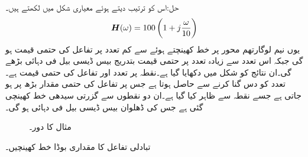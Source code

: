 حل:اس کو ترتیب دیتے ہوئے معیاری شکل میں لکھتے ہیں۔
\begin{align*}
{\ensuremath{{\boldsymbol{H}}}}(\omega)=100\left(1+j\frac{\omega}{10}\right)
\end{align*}
یوں نیم لوگارتھم محور پر خط کھینچتے ہوئے  سے کم تعدد  پر تفاعل کی حتمی قیمت  ہو گی جبکہ اس تعدد سے زیادہ تعدد پر حتمی قیمت بتدریج بیس ڈیسی بیل فی دہائی بڑھے گی۔ان نتائج کو شکل  میں دکھایا گیا ہے۔نقطہ  پر تعدد  اور تفاعل کی حتمی قیمت  ہے۔تعدد کو دس گنا کرنے سے  حاصل ہوتا ہے جس پر تفاعل کی حتمی مقدار بڑھ پر  ہو جاتی ہے جسے نقطہ  سے ظاہر کیا گیا ہے۔ان دو نقطوں سے گزرتی سیدھی خط کھینچی گئی ہے جس کی ڈھلوان بیس ڈیسی بیل فی دہائی ہو گی۔
\begin{figure}
\centering
{}
\caption{مثال  کا دور۔}
\label{شکل_تعددی_ایک_قطب_دس_تعدد}
\end{figure}
تبادلی تفاعل  کا مقداری بوڈا خط کھینچیں۔

